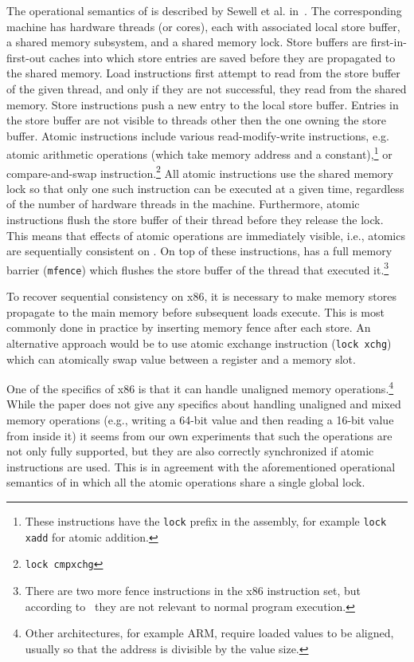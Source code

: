 The operational semantics of \xtso is described by Sewell et al.
in~\cite{x86tso}.
The corresponding machine has hardware threads (or cores), each with associated
local store buffer, a shared memory subsystem, and a shared memory lock.
Store buffers are first-in-first-out caches into which store entries are saved
before they are propagated to the shared memory.
Load instructions first attempt to read from the store buffer of the given
thread, and only if they are not successful, they read from the shared memory.
Store instructions push a new entry to the local store buffer.
Entries in the store buffer are not visible to threads other then the one
owning the store buffer.
Atomic instructions include various read-modify-write instructions, e.g. atomic
arithmetic operations (which take memory address and a constant),\footnote{These
  instructions have the \texttt{lock} prefix in the assembly, for example
  \texttt{lock xadd} for atomic addition.}
or compare-and-swap instruction.\footnote{\texttt{lock cmpxchg}}
All atomic instructions use the shared memory lock so that only one such
instruction can be executed at a given time, regardless of the number of
hardware threads in the machine.
Furthermore, atomic instructions flush the store buffer of their thread before
they release the lock.
This means that effects of atomic operations are immediately visible, i.e.,
atomics are sequentially consistent on \xtso.
On top of these instructions, \xtso has a full memory barrier (\texttt{mfence})
which flushes the store buffer of the thread that executed it.\footnote{There
are two more fence instructions in the x86 instruction set, but according
to~\cite{x86tso} they are not relevant to normal program execution.}

To recover sequential consistency on x86, it is necessary to make memory stores
propagate to the main memory before subsequent loads execute.
This is most commonly done in practice by inserting memory fence after each
store.
An alternative approach would be to use atomic exchange instruction
(\texttt{lock xchg}) which can atomically swap value between a register and a
memory slot.

One of the specifics of x86 is that it can handle unaligned memory
operations.\footnote{Other architectures, for example ARM, require loaded
values to be aligned, usually so that the address is divisible by the value
size.}
While the \xtso paper does not give any specifics about handling unaligned and
mixed memory operations (e.g., writing a 64-bit value and then reading a 16-bit
value from inside it) it seems from our own experiments that such the
operations are not only fully supported, but they are also correctly
synchronized if atomic instructions are used.
This is in agreement with the aforementioned operational semantics of \xtso in
which all the atomic operations share a single global lock.

